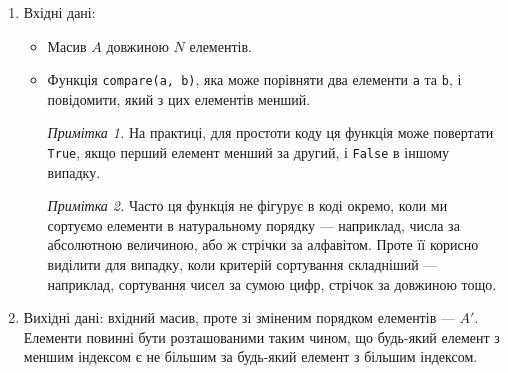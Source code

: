 \documentclass[12pt,a4paper]{report}
\begin{document}
\begin{enumerate}
    \item Вхідні дані:
        \begin{itemize}
            \item Масив \(A\) довжиною \(N\) елементів.
            \item Функція \lstinline{compare(a, b)}, яка може порівняти два елементи \lstinline{a} та \lstinline{b}, і повідомити, який з цих елементів менший.

                \emph{Примітка 1.} На практиці, для простоти коду ця функція може повертати \lstinline{True}, якщо перший елемент менший за другий, і \lstinline{False} в іншому випадку.

                

                \emph{Примітка 2.} Часто ця функція не фігурує в коді окремо, коли ми сортуємо елементи в натуральному порядку --- наприклад, числа за абсолютною величиною, або ж стрічки за алфавітом.
                Проте її корисно виділити для випадку, коли критерій сортування складніший --- наприклад, сортування чисел за сумою цифр, стрічок за довжиною тощо.

                
        \end{itemize}
    \item Вихідні дані: вхідний масив, проте зі зміненим порядком елементів --- \(A'\). Елементи повинні бути розташованими таким чином, що будь-який елемент з меншим індексом є не більшим за будь-який елемент з більшим індексом.
\end{enumerate}
\end{document}

